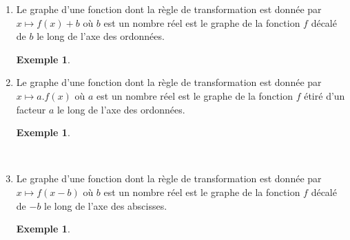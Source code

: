\documentclass[a4paper,13pt]{scrreprt}
\theoremstyle{plain}
\theoremstyle{definition}
\newtheorem{exe}[subsection]{Exemple}
\begin{document}
\begin{enumerate}
	\item Le graphe d'une fonction dont la règle de transformation est donnée par $x \mapsto f(x) + b$ où $b$ est un nombre réel est le graphe de la fonction $f$ décalé de $b$ le long de l'axe des ordonnées.
	\begin{exe} ~~\\
		\begin{center}
		\end{center}
	\end{exe}
\newpage
	\item Le graphe d'une fonction dont la règle de transformation est donnée par $x \mapsto a.f(x)$ où $a$ est un nombre réel est le graphe de la fonction $f$ étiré d'un facteur $a$ le long de l'axe des ordonnées.
	\begin{exe} ~~\\
		\begin{center}
		\end{center}
	\end{exe}
~\\
	\item Le graphe d'une fonction dont la règle de transformation est donnée par $x \mapsto f(x-b)$ où $b$ est un nombre réel est le graphe de la fonction $f$ décalé de $-b$ le long de l'axe des abscisses.
	\begin{exe} ~~\\
		\begin{center}
\end{center}
\end{exe}
\end{enumerate}
\end{document}
